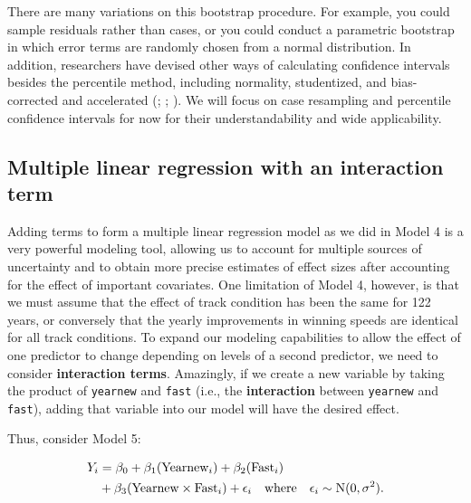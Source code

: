 \documentclass[
]{krantz}
\begin{document}
There are many variations on this bootstrap procedure. For example, you could sample residuals rather than cases, or you could conduct a parametric bootstrap in which error terms are randomly chosen from a normal distribution. In addition, researchers have devised other ways of calculating confidence intervals besides the percentile method, including normality, studentized, and bias-corrected and accelerated (\citet{Hesterberg2015}; \citet{Efron1993}; \citet{Davison1997}). We will focus on case resampling and percentile confidence intervals for now for their understandability and wide applicability.

\hypertarget{multiple-linear-regression-with-an-interaction-term}{%
\subsection{Multiple linear regression with an interaction term}\label{multiple-linear-regression-with-an-interaction-term}}

Adding terms to form a multiple linear regression model as we did in Model 4 is a very powerful modeling tool, allowing us to account for multiple sources of uncertainty and to obtain more precise estimates of effect sizes after accounting for the effect of important covariates. One limitation of Model 4, however, is that we must assume that the effect of track condition has been the same for 122 years, or conversely that the yearly improvements in winning speeds are identical for all track conditions. To expand our modeling capabilities to allow the effect of one predictor to change depending on levels of a second predictor, we need to consider \textbf{interaction terms}. Amazingly, if we create a new variable by taking the product of \texttt{yearnew} and \texttt{fast} (i.e., the \textbf{interaction} between \texttt{yearnew} and \texttt{fast}), adding that variable into our model will have the desired effect.

Thus, consider Model 5:

\begin{equation}
\begin{split}
 Y_{i}&= \beta_{0}+\beta_{1}(\textrm{Yearnew}_{i})+\beta_{2}(\textrm{Fast}_{i}) \notag \\
      &{}+\beta_{3}(\textrm{Yearnew}\times\textrm{Fast}_{i})+\epsilon_{i}\quad \textrm{where}\quad \epsilon_{i}\sim \textrm{N}(0,\sigma^2).
\end{split}
\label{eq:model5}
\end{equation}
\end{document}
